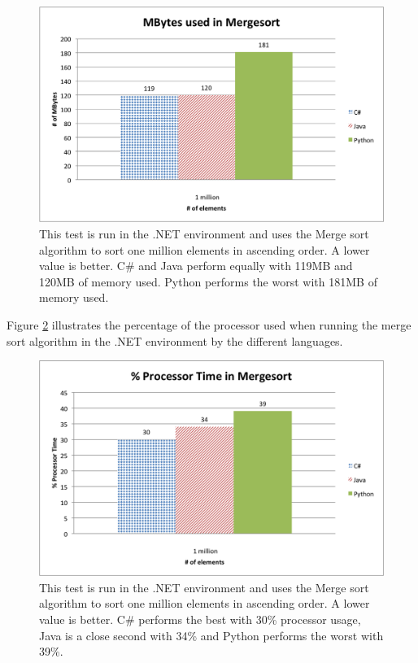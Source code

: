 \begin{figure}[h]
	\centering
	\includegraphics[width=1.0\linewidth]{chapters/new_media/MBytesMergesort.png}
	\caption{This test is run in the .NET environment and uses the Merge sort algorithm to sort one million elements in ascending order. A lower value is better. C\# and Java perform equally with 119MB and 120MB of memory used. Python performs the worst with 181MB of memory used. }
	\label{fig:net_merge_sort_memory}
\end{figure}

Figure \ref{fig:net_merge_sort_processor} illustrates the percentage of the processor used when running the merge sort algorithm in the .NET environment by the different languages.

\begin{figure}[h]
	\centering
	\includegraphics[width=1.0\linewidth]{chapters/new_media/ProcessorTime.png}
	\caption{This test is run in the .NET environment and uses the Merge sort algorithm to sort one million elements in ascending order. A lower value is better. C\# performs the best with 30\% processor usage, Java is a close second with 34\% and Python performs the worst with 39\%. }
	\label{fig:net_merge_sort_processor}
\end{figure}
